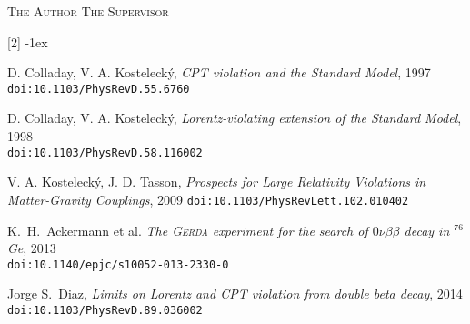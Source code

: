 \documentclass[11pt, a4paper]{article}
\begin{document}
\vspace{1.5cm}
\begin{multicols}{2}
\noindent
\textsc{The Author}
\columnbreak
\flushright
\textsc{The Supervisor}
\end{multicols}
\vspace*{\fill}
\begin{labeling}{{[2]}}
\footnotesize
\itemsep-1ex
	\item[{[1]}] D. Colladay, V. A. Kosteleck\'y, \emph{CPT violation and the Standard Model}, 1997\\\texttt{doi:10.1103/PhysRevD.55.6760}
	\item[{[2]}] D. Colladay, V. A. Kosteleck\'y, \emph{Lorentz-violating extension of the Standard Model}, 1998\\\texttt{doi:10.1103/PhysRevD.58.116002}
	\item[{[3]}] V. A. Kosteleck\'y, J. D. Tasson, \emph{Prospects for Large Relativity Violations in Matter-Gravity Couplings}, 2009 \texttt{doi:10.1103/PhysRevLett.102.010402}
	\item[{[4]}] K.~H.~Ackermann et al. \emph{The \textsc{Gerda} experiment for the search of $0\nu\beta\beta$ decay in $^{76}$Ge}, 2013\\\texttt{doi:10.1140/epjc/s10052-013-2330-0}
	\item[{[5]}] Jorge S.~Diaz, \emph{Limits on Lorentz and CPT violation from double beta decay}, 2014\\\texttt{doi:10.1103/PhysRevD.89.036002}
\end{labeling}
\end{document}
